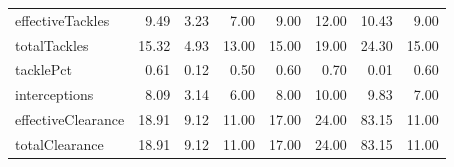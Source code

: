 \begin{table}[H]
\begin{tabular}{lrrrrrrr}
effectiveTackles & 9.49 & 3.23 & 7.00 & 9.00 & 12.00 & 10.43 & 9.00 \\
totalTackles & 15.32 & 4.93 & 13.00 & 15.00 & 19.00 & 24.30 & 15.00 \\
tacklePct & 0.61 & 0.12 & 0.50 & 0.60 & 0.70 & 0.01 & 0.60 \\
interceptions & 8.09 & 3.14 & 6.00 & 8.00 & 10.00 & 9.83 & 7.00 \\
effectiveClearance & 18.91 & 9.12 & 11.00 & 17.00 & 24.00 & 83.15 & 11.00 \\
totalClearance & 18.91 & 9.12 & 11.00 & 17.00 & 24.00 & 83.15 & 11.00 \\
\hline
\end{tabular}
\end{table}
